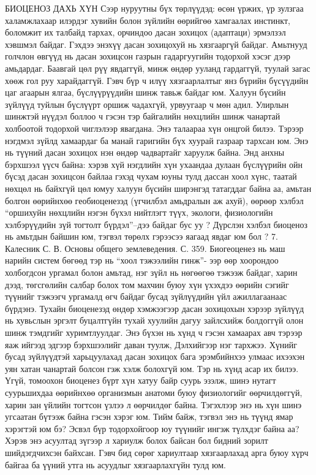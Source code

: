 БИОЦЕНОЗ ДАХЬ ХҮН
Сээр нуруутны бүх төрлүүдэд: өсөн үржих, үр зулзгаа халамжлахаар илэрдэг хувийн болон зүйлийн өөрийгөө хамгаалах инстинкт, боломжит их талбайд тархах, орчиндоо дасан зохицох (адаптаци) эрмэлзэл хэвшмэл байдаг. Гэхдээ энэхүү дасан зохицохуй нь хязгааргүй байдаг. Амьтнууд голчлон өвгүүд нь дасан зохицсон газрын гадаргуугийн тодорхой хэсэг дээр амьдардаг. Баавгай цөл рүү явдаггүй, минж өндөр ууланд гардаггүй, туулай загас хөөж гол руу харайдаггүй. Гэвч бүр ч илүү хязгаарлалтыг янз бүрийн бүсүүдийн цаг агаарын ялгаа, бүслүүрүүдийн шинж тавьж байдаг юм. Халуун бүсийн зүйлүүд туйлын бүслүүрт оршиж чадахгүй, урвуугаар ч мөн адил. Улирлын шинжтэй нүүдэл боллоо ч гэсэн тэр байгалийн нөхцлийн шинж чанартай холбоотой тодорхой чиглэлээр явагдана.
Энэ талаараа хүн онцгой билээ. Тэрээр нэгдмэл зүйлд хамаардаг ба манай гаригийн бүх хуурай газраар тархсан юм. Энэ нь түүний дасан зохицох нэн өндөр чадвартайг харуулж байна. Энд анхны бэрхшээл үүсч байна: хэрэв хүй нэгдлийн хүн ухаандаа дулаан бүслүүрийн ойн бүсэд дасан зохицсон байлаа гэхэд чухам юуны тулд дассан хоол хүнс, таатай нөхцөл нь байхгүй цөл юмуу халуун бүсийн ширэнгэд татагддаг байна аа, амьтан болгон өөрийнхөө геобиоценезэд (үгчилбэл амьдралын аж ахуй), өөрөөр хэлбэл “оршихуйн нөхцлийн нэгэн бүхэл нийтлэгт түүх, экологи, физиологийн хэлбэрүүдийн зүй тогтолт бүрдэл”–дээ байдаг бус уу ? Дүрслэн хэлбэл биоценоз нь амьтдын байшин юм, тэгвэл төрөлх гэрээсээ яагаад явдаг юм бол ? 7. Калесник С. В. Основы общего землеведения. С. 359.
Биогеоценез нь маш нарийн систем бөгөөд тэр нь “хоол тэжээлийн гинж”- ээр өөр хоорондоо холбогдсон ургамал болон амьтад, нэг зүйл нь нөгөөгөө тэжээж байдаг, харин дээд, төгсгөлийн салбар болох том махчин буюу хүн үхэхдээ өөрийн сэгийг түүнийг тэжээгч ургамалд өгч байдаг бусад зүйлүүдийн үйл ажиллагаанаас бүрдэнэ. Тухайн биоценезэд өндөр хэмжээгээр дасан зохицохын хэрээр зүйлүүд нь хувьслын эргэлт буцалтгүйн тухай хуулийн дагуу зайлсхийж болдоггүй олон шинж тэмдгийг хуримтлуулдаг. Энэ бүхэн нь хүнд ч гэсэн хамаарах авч тэрээр яаж ийгээд эдгээр бэрхшээлийг даван туулж, Дэлхийгээр нэг тархжээ. Хүнийг бусад зүйлүүдтэй харьцуулахад дасан зохицох бага эрэмбийнхээ улмаас ихээхэн уян хатан чанартай болсон гэж хэлж болохгүй юм. Тэр нь хүнд асар их билээ.
Үгүй, томоохон биоценез бүрт хүн хатуу байр суурь эзэлж, шинэ нутагт суурьшихдаа өөрийнхөө организмын анатоми буюу физиологийг өөрчилдөггүй, харин зан үйлийн тогтсон үзлээ л өөрчилдөг байна. Тэгэхлээр энэ нь хүн шинэ угсаатан бүтээж байна гэсэн хэрэг юм. Тийм байж, тэгвэл энэ нь түүнд ямар хэрэгтэй юм бэ? Эсвэл бүр тодорхойгоор юу түүнийг ингэж түлхдэг байна аа? Хэрэв энэ асуултад зүгээр л хариулж болох байсан бол бидний зорилт шийдэгдчихсэн байхсан. Гэвч бид сөрөг хариултаар хязгаарлахад арга буюу хүрч байгаа ба үүний утга нь асуудлыг хязгаарлахгүйн тулд юм.
